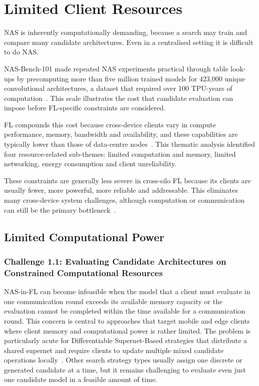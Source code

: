 \section{Limited Client Resources}

NAS is inherently computationally demanding, because a search may train and compare many candidate architectures. Even in a centralised setting it is difficult to do NAS.

NAS-Bench-101 made repeated NAS experiments practical through table look-ups by precomputing more than five million trained models for 423,000 unique convolutional architectures, a dataset that required over 100 TPU-years of computation~\cite{ying2019nasbench101reproducibleneuralarchitecture}. This scale illustrates the cost that candidate evaluation can impose before FL-specific constraints are considered.

FL compounds this cost because cross-device clients vary in compute performance, memory, bandwidth and availability, and these capabilities are typically lower than those of data-centre nodes~\cite{fl_advances_and_open_problems_2021,fl_in_practice_reflections_2024}. This thematic analysis identified four resource-related sub-themes: limited computation and memory, limited networking, energy consumption and client unreliability.

These constraints are generally less severe in cross-silo FL because its clients are usually fewer, more powerful, more reliable and addressable. This eliminates many cross-device system challenges, although computation or communication can still be the primary bottleneck~\cite{fl_advances_and_open_problems_2021}.

\subsection{Limited Computational Power} %

\subsubsection{Challenge 1.1: Evaluating Candidate Architectures on Constrained Computational Resources}

NAS-in-FL can become infeasible when the model that a client must evaluate in one communication round exceeds its available memory capacity or the evaluation cannot be completed within the time available for a communication round. This concern is central to approaches that target mobile and edge clients~\cite{fedoras_2022,fednas_over_hetero_mobile_devices_2022,dfnas_2020} where client memory and computational power is rather limited. The problem is particularly acute for Differentiable Supernet-Based strategies that distribute a shared supernet and require clients to update multiple mixed candidate operations locally~\cite{fednas_2021,dp-fnas_2020,feathers_2023,fed_auto_mri_2023}. Other search strategy types usually assign one discrete or generated candidate at a time, but it remains challenging to evaluate even just one candidate model in a feasible amount of time.

